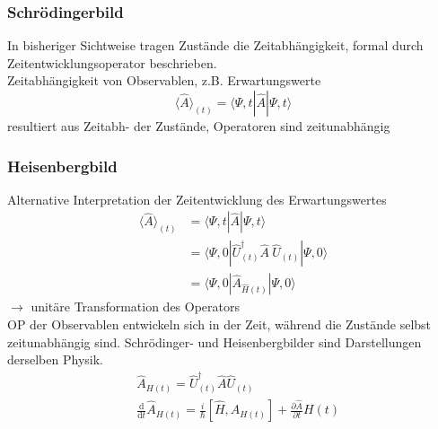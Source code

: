 \documentclass[10pt,article,colorback,accentcolor=tud9d]{scrartcl}
\begin{document}
\subsubsection{Schrödingerbild}
In bisheriger Sichtweise tragen Zustände die Zeitabhängigkeit, formal durch Zeitentwicklungsoperator beschrieben.\\
Zeitabhängigkeit von Observablen, z.B. Erwartungswerte
\begin{equation}
\langle\hat{A}\rangle_{(t)}=\langle\Psi,t\left.\right|\hat{A}\left.\right|\Psi,t\rangle
\end{equation}
resultiert aus Zeitabh- der Zustände, Operatoren sind zeitunabhängig
\subsubsection{Heisenbergbild}
Alternative Interpretation der Zeitentwicklung des Erwartungswertes 
\begin{align}
\langle\hat{A}\rangle_{(t)}&=\langle\Psi,t\left.\right|\hat{A}\left.\right|\Psi,t\rangle\\
&=\langle\Psi,0\left.\right|\hat{U}^\dagger_{(t)}\hat{A}\ \hat{U}_{(t)}\left.\right|\Psi,0\rangle\\
&=\langle\Psi,0\left.\right|\hat{A}_{\hat{H}(t)}\left.\right|\Psi,0\rangle
\end{align}
$\rightarrow$ unitäre Transformation des Operators\\
OP der Observablen entwickeln sich in der Zeit, während die Zustände selbst zeitunabhängig sind. Schrödinger- und Heisenbergbilder sind Darstellungen derselben Physik.
\begin{align}
&\hat{A}_{H(t)}=\hat{U}^\dagger_{(t)}\hat{A}\hat{U}_{(t)}\\
&\frac{\text{d}}{\text{d}t}\hat{A}_{H(t)}=\frac{i}{\hbar}\left[\hat{H},\hat{A}_{H(t)}\right]+\frac{\partial \hat{A}}{\partial t}H(t)
\end{align}
\end{document}
